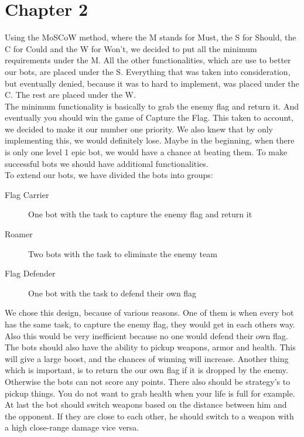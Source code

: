 \chapter{Chapter 2}
Using the MoSCoW method, where the M stands for Must, the S for Should, the C for Could and the W for Won't, we decided to put all the minimum requirements under the M. All the other functionalities, which are use to better our bots, are placed under the S. Everything that was taken into consideration, but eventually denied, because it was to hard to implement, was placed under the C. The rest are placed under the W.\\

The minimum functionality is basically to grab the enemy flag and return it. And eventually you should win the game of Capture the Flag. This taken to account, we decided to make it our number one priority. We also knew that by only implementing this, we would definitely lose. Maybe in the beginning, when there is only one level 1 epic bot, we would have a chance at beating them. To make successful bots we should have additional functionalities.\\ 

To extend our bots, we have divided the bots into groups:
\begin{description}
	\item[Flag Carrier] One bot with the task to capture the enemy flag and return it
	\item[Roamer] Two bots with the task to eliminate the enemy team
	\item[Flag Defender] One bot with the task to defend their own flag 
\end{description}
We chose this design, because of various reasons. One of them is when every bot has the same task, to capture the enemy flag, they would get in each others way. Also this would be very inefficient because no one would defend their own flag. The bots should also have the ability to pickup weapons, armor and health. This will give a large boost, and the chances of winning will increase. Another thing which is important, is to return the our own flag if it is dropped by the enemy. Otherwise the bots can not score any points. There also should be strategy's to pickup things. You do not want to grab health when your life is full for example. At last the bot should switch weapons based on the distance between him and the opponent. If they are close to each other, he should switch to a weapon with a high close-range damage vice versa.\\

